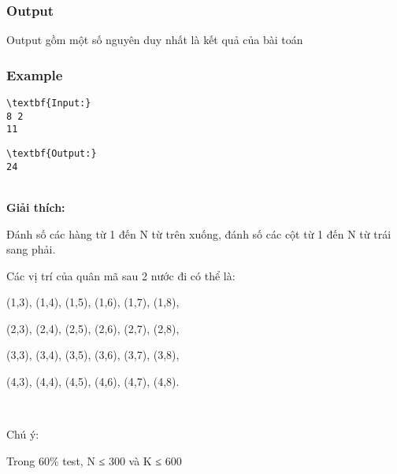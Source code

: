 \subsubsection{Output}

Output gồm một số nguyên duy nhất là kết quả của bài toán

\subsubsection{Example}
\begin{verbatim}
\textbf{Input:}
8 2
11\end{verbatim}
\begin{verbatim}
\textbf{Output:}
24\end{verbatim}


\\\textbf{​Giải thích:}

Đánh số các hàng từ 1 đến N từ trên xuống, đánh số các cột từ 1 đến N từ trái sang phải.

Các vị trí của quân mã sau 2 nước đi có thể là:

(1,3), (1,4), (1,5), (1,6), (1,7), (1,8),

(2,3), (2,4), (2,5), (2,6), (2,7), (2,8),

(3,3), (3,4), (3,5), (3,6), (3,7), (3,8),

(4,3), (4,4), (4,5), (4,6), (4,7), (4,8).

 

Chú ý:

Trong 60\% test, N ≤ 300 và K ≤ 600